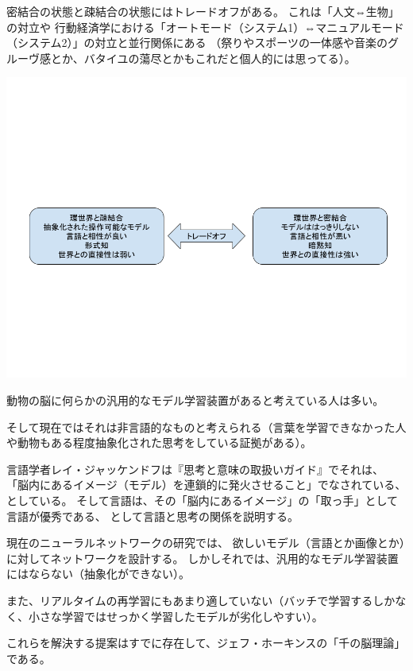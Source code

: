 \documentclass[12pt, unicode]{beamer}
\begin{document}
\begin{frame}

  \vspace{1\baselineskip}
密結合の状態と疎結合の状態にはトレードオフがある。
これは「人文⇔生物」の対立や
行動経済学における「オートモード（システム1）⇔マニュアルモード（システム2）」の対立と並行関係にある
（祭りやスポーツの一体感や音楽のグルーヴ感とか、バタイユの蕩尽とかもこれだと個人的には思ってる）。

\vspace{-3\baselineskip}
\centering
\includegraphics[keepaspectratio, scale=0.3]{open_umwelt.png}

\end{frame}

\begin{frame}

動物の脳に何らかの汎用的なモデル学習装置があると考えている人は多い。

そして現在ではそれは非言語的なものと考えられる（言葉を学習できなかった人や動物もある程度抽象化された思考をしている証拠がある）。

言語学者レイ・ジャッケンドフは『思考と意味の取扱いガイド』でそれは、
「脳内にあるイメージ（モデル）を連鎖的に発火させること」でなされている、としている。
そして言語は、その「脳内にあるイメージ」の「取っ手」として言語が優秀である、
として言語と思考の関係を説明する。

\end{frame}

\begin{frame}

現在のニューラルネットワークの研究では、
欲しいモデル（言語とか画像とか）に対してネットワークを設計する。
しかしそれでは、汎用的なモデル学習装置にはならない（抽象化ができない）。

また、リアルタイムの再学習にもあまり適していない（バッチで学習するしかなく、小さな学習ではせっかく学習したモデルが劣化しやすい）。

これらを解決する提案はすでに存在して、ジェフ・ホーキンスの「千の脳理論」である。

\end{frame}
\end{document}
